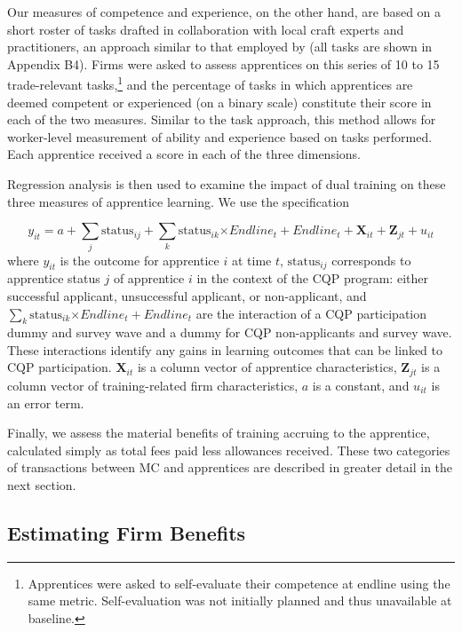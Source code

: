 \documentclass[
  a4paper, twoside, 12pt]{book}
\begin{document}
Our measures of competence and experience, on the other hand, are based on a short roster of tasks drafted in collaboration with local craft experts and practitioners, an approach similar to that employed by \textcite{hardy2019} (all tasks are shown in Appendix B4). Firms were asked to assess apprentices on this series of 10 to 15 trade-relevant tasks,\footnote{Apprentices were asked to self-evaluate their competence at endline using the same metric. Self-evaluation was not initially planned and thus unavailable at baseline.} and the percentage of tasks in which apprentices are deemed competent or experienced (on a binary scale) constitute their score in each of the two measures. Similar to the task approach, this method allows for worker-level measurement of ability and experience based on tasks performed. Each apprentice received a score in each of the three dimensions.

Regression analysis is then used to examine the impact of dual training on these three measures of apprentice learning. We use the specification

\[ y_{it} = a+\sum_{j}\text{status}_{ij}+\sum_{k}\text{status}_{ik}\text{×}Endline_t+{Endline}_t+\mathbf{X}_{it}+\mathbf{Z}_{jt}+u_{it} \]
where \(y_{it}\) is the outcome for apprentice \(i\) at time \(t\), \(\text{status}_{ij}\) corresponds to apprentice status \(j\) of apprentice \(i\) in the context of the CQP program: either successful applicant, unsuccessful applicant, or non-applicant, and \(\sum_{k}\text{status}_{ik}\text{×}Endline_t+{Endline}_t\) are the interaction of a CQP participation dummy and survey wave and a dummy for CQP non-applicants and survey wave. These interactions identify any gains in learning outcomes that can be linked to CQP participation. \(\mathbf{X}_{it}\) is a column vector of apprentice characteristics, \(\mathbf{Z}_{jt}\) is a column vector of training-related firm characteristics, \(a\) is a constant, and \(u_{it}\) is an error term.

Finally, we assess the material benefits of training accruing to the apprentice, calculated simply as total fees paid less allowances received. These two categories of transactions between MC and apprentices are described in greater detail in the next section.

\hypertarget{firmmethod}{%
\subsection{Estimating Firm Benefits}\label{firmmethod}}
\end{document}
